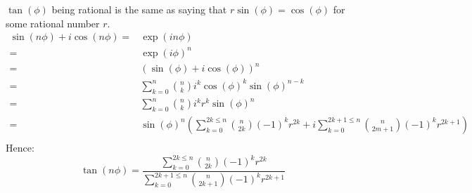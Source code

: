 $\tan(\phi)$ being rational is the same as saying that $r\sin(\phi) = \cos(\phi)$ for some rational number $r$.
\begin{equation*}
\begin{aligned}
	\sin(n\phi)+i\cos(n\phi) =& \exp(in\phi)\\
	=& \exp(i\phi)^n \\
	=& (\sin(\phi)+i\cos(\phi))^n\\
	=& \sum_{k=0}^{n}\binom{n}{k}i^k\cos(\phi)^k\sin(\phi)^{n-k}\\
	=& \sum_{k=0}^{n}\binom{n}{k}i^kr^k\sin(\phi)^n\\
	=&\sin(\phi)^n\left(\sum_{k=0}^{2k \leq n}\binom{n}{2k}(-1)^kr^{2k}+i\sum_{k=0}^{2k+1 \leq n}\binom{n}{2m+1}(-1)^kr^{2k+1}\right)\\
\end{aligned}
\end{equation*}
Hence:
\[\tan(n\phi) = \frac{\sum_{k=0}^{2k \leq n}\binom{n}{2k}(-1)^kr^{2k}}{\sum_{k=0}^{2k+1 \leq n}\binom{n}{2k+1}(-1)^kr^{2k+1}}\]

